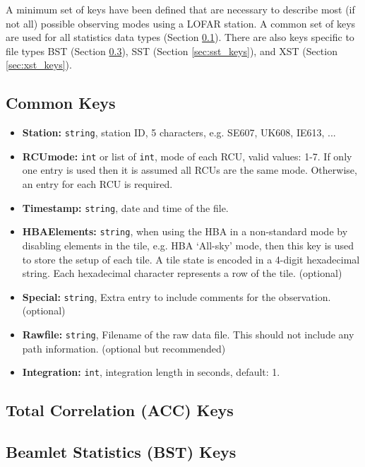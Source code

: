 \documentclass[10pt,a4paper]{article}
\begin{document}
A minimum set of keys have been defined that are necessary to describe most (if
not all) possible observing modes using a LOFAR station. A common set of keys
are used for all statistics data types (Section \ref{sec:common_keys}). There
are also keys specific to file types BST (Section \ref{sec:bst_keys}), SST
(Section \ref{sec:sst_keys}), and XST (Section \ref{sec:xst_keys}).

\subsection{Common Keys}
\label{sec:common_keys}

\begin{itemize}
    \item \textbf{Station:} \texttt{string}, station ID, 5 characters, e.g.
    SE607, UK608, IE613, ...
    \item \textbf{RCUmode:} \texttt{int} or list of \texttt{int}, mode of each
    RCU, valid values: 1-7. If only one entry is used then it is assumed all
    RCUs are the same mode. Otherwise, an entry for each RCU is required.
    \item \textbf{Timestamp:} \texttt{string}, date and time of the file.
    \item \textbf{HBAElements:} \texttt{string}, when using the HBA in a
    non-standard mode by disabling elements in the tile, e.g. HBA `All-sky'
    mode, then this key is used to store the setup of each tile. A tile state is
    encoded in a 4-digit hexadecimal string. Each hexadecimal character
    represents a row of the tile. (optional)
    \item \textbf{Special:} \texttt{string}, Extra entry to include comments for
    the observation. (optional)
    \item \textbf{Rawfile:} \texttt{string}, Filename of the raw data file. This
    should not include any path information.
    (optional but recommended)
    \item \textbf{Integration:} \texttt{int}, integration length in seconds,
    default: 1.
\end{itemize}

\subsection{Total Correlation (ACC) Keys}

\subsection{Beamlet Statistics (BST) Keys}
\label{sec:bst_keys}
\end{document}
